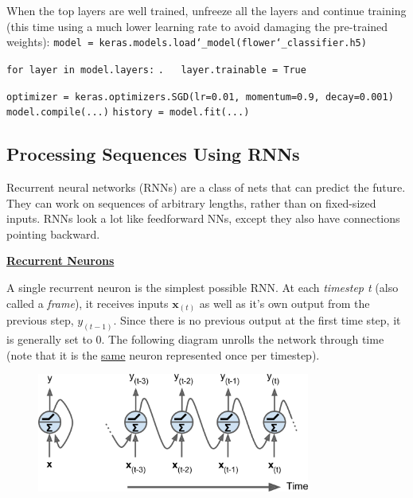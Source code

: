 When the top layers are well trained, unfreeze all the layers and continue training\newline
(this time using a much lower learning rate to avoid damaging the pre-trained weights):\newline
\texttt{model = keras.models.load\char`_model(\textquotesingle flower\char`_classifier.h5\textquotesingle)}

\texttt{for layer in model.layers:}\newline
\texttt{.~~~layer.trainable = True}

\texttt{optimizer = keras.optimizers.SGD(lr=0.01, momentum=0.9, decay=0.001)}\newline
\texttt{model.compile(...)}\newline
\texttt{history = model.fit(...)}

\subsection{Processing Sequences Using RNNs}

Recurrent neural networks (RNNs) are a class of nets that can predict the future.\newline
They can work on sequences of arbitrary lengths, rather than on fixed-sized inputs.\newline
RNNs look a lot like feedforward NNs,
except they also have connections pointing backward.\newline

\textbf{\underline{Recurrent Neurons}}

A single recurrent neuron is the simplest possible RNN.
At each \textit{timestep t} (also called a \textit{frame}),
it receives inputs $\boldsymbol{x}_{(t)}$ as well as it's own output from the previous step, $y_{(t-1)}$.
Since there is no previous output at the first time step, it is generally set to 0.
The following diagram unrolls the network through time (note that it is the \underline{same} neuron represented once per timestep).

\begin{figure}[ht]
\centering
\includegraphics[width=0.80\textwidth]{./images/recurrent_neuron.png}
\end{figure}

